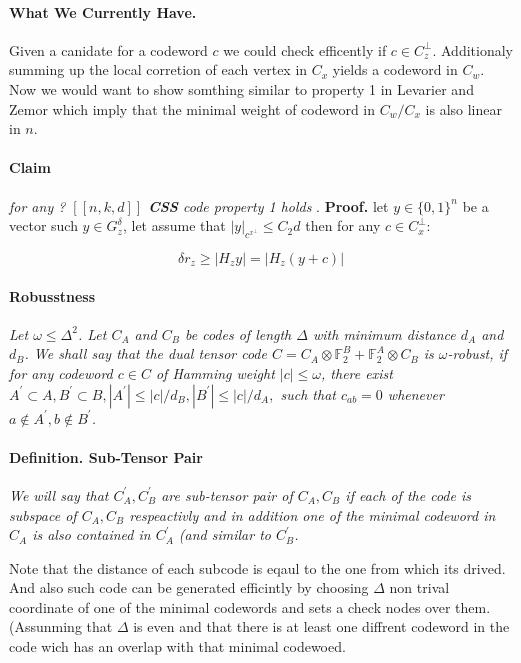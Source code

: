 \documentclass{article}
\newcommand{\Gz}{ G_{z}^{\delta} }
\begin{document}
\begin{multicols*}{2}
	\paragraph{What We Currently Have.} Given a canidate for a codeword $c$ we could check efficently if $c\in C_{z}^\perp$.  
	Additionaly summing up the local corretion of each vertex in $C_{x}$ yields a codeword in $C_{w}$. Now we would want to show 
	somthing similar to property 1 in Levarier and Zemor which imply that the minimal weight of codeword in $C_{w}/C_{x}$ is also linear
	in $n$. 
	\paragraph{Claim} \textit{ for any ?  $ \left[ \left[ n,k,d \right] \right] $ \textbf{CSS} code property 1 holds }. 
\textbf{Proof.} let $y \in \{0,1\}^{n}$ be a vector such $ y \in \Gz $, let assume that $|y|_{c^{x^{\perp}}} \le C_{2} d$ then for any $ c \in C_{x}^{\perp}$: 

\begin{equation*}
    \delta r_z \ge | H_{z} y | = | H_{z} \left( y + c \right) |  
\end{equation*}
\paragraph{Robusstness} \textit{ Let $ \omega \le \Delta^{2}$. Let $C_{A}$ and $C_{B}$ be codes of length $\Delta$ with minimum distance $d_{A}$ and $d_{B}$. We shall say that the dual tensor code $C = C_{A}\otimes \mathbb{F}^{B}_{2} + \mathbb{F}^{A}_{2} \otimes C_{B}$ is $\omega$-robust, if for any codeword $c\in C$ of Hamming weight $|c|\le \omega$, there exist $A^{\prime}\subset A, B^{\prime}\subset B, |A^{\prime}|\le |c|/d_{B}, |B^{\prime}|\le |c|/d_{A},$ such that $c_{ab}=0$ whenever $a \notin A^{\prime}, b \notin B^{\prime}$.} 
\paragraph{Definition. Sub-Tensor Pair} \textit{ We will say that $C_{A}^{\prime}, C_{B}^{\prime}$ are sub-tensor pair of $C_A,C_B$ if each of the code is subspace of $C_A, C_B$ respeactivly and in addition one of the  minimal codeword in $C_{A}$ is also contained in $C_{A}^{\prime}$ (and similar to $C_{B}^{\prime}$.}

  Note that the distance of each subcode is eqaul to the one from which its drived. And also such code can be generated efficintly by choosing $\Delta$ non trival coordinate of one of the minimal codewords and sets a check nodes over them. (Assunming that $\Delta$ is even and that there is at least one diffrent codeword in the code wich has an overlap with that minimal codewoed.    


\end{multicols*}
\end{document}
